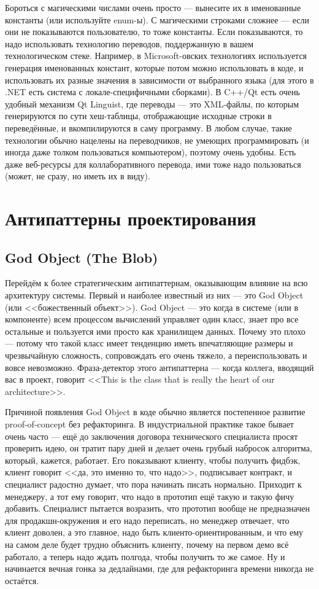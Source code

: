 \documentclass{../../text-style}
\begin{document}
Бороться с магическими числами очень просто --- вынесите их в именованные константы (или используйте enum-ы). С магическими строками сложнее --- если они не показываются пользователю, то тоже константы. Если показываются, то надо использовать технологию переводов, поддержанную в вашем технологическом стеке. Например, в Microsoft-овских технологиях используется генерация именованных констант, которые потом можно использовать в коде, и использовать их разные значения в зависимости от выбранного языка (для этого в .NET есть система с локале-специфичными сборками). В C++/Qt есть очень удобный механизм Qt Linguist, где переводы --- это XML-файлы, по которым генерируются по сути хеш-таблицы, отображающие исходные строки в переведённые, и вкомпилируются в саму программу. В любом случае, такие технологии обычно нацелены на переводчиков, не умеющих программировать (и иногда даже толком пользоваться компьютером), поэтому очень удобны. Есть даже веб-ресурсы для коллаборативного перевода, ими тоже надо пользоваться (может, не сразу, но иметь их в виду).

\section{Антипаттерны проектирования}

\subsection{God Object (The Blob)}

Перейдём к более стратегическим антипаттернам, оказывающим влияние на всю архитектуру системы. Первый и наиболее известный из них --- это God Object (или <<божественный объект>>). God Object --- это когда в системе (или в компоненте) всем процессом вычислений управляет один класс, знает про все остальные и пользуется ими просто как хранилищем данных. Почему это плохо --- потому что такой класс имеет тенденцию иметь впечатляющие размеры и чрезвычайную сложность, сопровождать его очень тяжело, а переиспользовать и вовсе невозможно. Фраза-детектор этого антипаттерна --- когда коллега, вводящий вас в проект, говорит <<This is the class that is really the heart of our architecture>>.

Причиной появления God Object в коде обычно является постепенное развитие proof-of-concept без рефакторинга. В индустриальной практике такое бывает очень часто --- ещё до заключения договора технического специалиста просят проверить идею, он тратит пару дней и делает очень грубый набросок алгоритма, который, кажется, работает. Его показывают клиенту, чтобы получить фидбэк, клиент говорит <<да, это именно то, что надо>>, подписывает контракт, и специалист радостно думает, что пора начинать писать нормально. Приходит к менеджеру, а тот ему говорит, что надо в прототип ещё такую и такую фичу добавить. Специалист пытается возразить, что прототип вообще не предназначен для продакшн-окружения и его надо переписать, но менеджер отвечает, что клиент доволен, а это главное, надо быть клиенто-ориентированным, и что ему на самом деле будет трудно объяснить клиенту, почему на первом демо всё работало, а теперь надо ждать полгода, чтобы получить то же самое. Ну и начинается вечная гонка за дедлайнами, где для рефакторинга времени никогда не остаётся.
\end{document}
